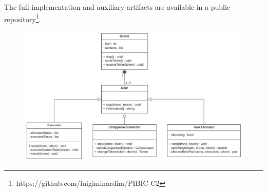 

The full implementation and auxiliary artifacts are available in a public repository\footnote{https://github.com/luigiminardim/PIBIC-C2}.

\begin{figure}[!ht]
  \centering
  \includegraphics[width=0.9\linewidth]{figures/diagramaDeClasse.png}
  \label{fig:ClassDiagram}
\end{figure}



